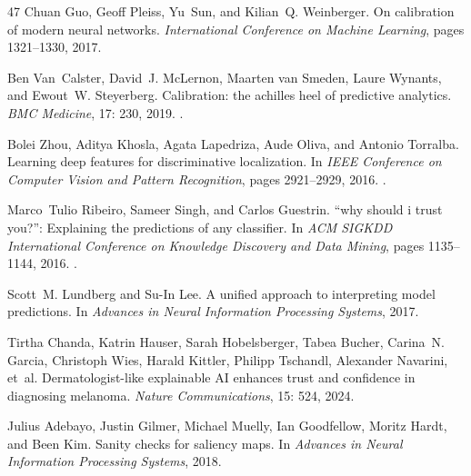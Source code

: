 \documentclass[11pt]{article}
\begin{document}
\begin{thebibliography}{47}
Chuan Guo, Geoff Pleiss, Yu~Sun, and Kilian~Q. Weinberger.
\newblock On calibration of modern neural networks.
\newblock \emph{International Conference on Machine Learning}, pages
  1321--1330, 2017.

Ben Van~Calster, David~J. McLernon, Maarten van Smeden, Laure Wynants, and
  Ewout~W. Steyerberg.
\newblock Calibration: the achilles heel of predictive analytics.
\newblock \emph{BMC Medicine}, 17: 230, 2019.
\newblock {}.

Bolei Zhou, Aditya Khosla, Agata Lapedriza, Aude Oliva, and Antonio Torralba.
\newblock Learning deep features for discriminative localization.
\newblock In \emph{IEEE Conference on Computer Vision and Pattern Recognition},
  pages 2921--2929, 2016.
\newblock {}.

Marco~Tulio Ribeiro, Sameer Singh, and Carlos Guestrin.
\newblock ``why should i trust you?'': Explaining the predictions of any
  classifier.
\newblock In \emph{ACM SIGKDD International Conference on Knowledge Discovery
  and Data Mining}, pages 1135--1144, 2016.
\newblock {}.

Scott~M. Lundberg and Su-In Lee.
\newblock A unified approach to interpreting model predictions.
\newblock In \emph{Advances in Neural Information Processing Systems}, 2017.

Tirtha Chanda, Katrin Hauser, Sarah Hobelsberger, Tabea Bucher, Carina~N.
  Garcia, Christoph Wies, Harald Kittler, Philipp Tschandl, Alexander Navarini,
  et~al.
\newblock Dermatologist-like explainable {AI} enhances trust and confidence in
  diagnosing melanoma.
\newblock \emph{Nature Communications}, 15: 524, 2024.

Julius Adebayo, Justin Gilmer, Michael Muelly, Ian Goodfellow, Moritz Hardt,
  and Been Kim.
\newblock Sanity checks for saliency maps.
\newblock In \emph{Advances in Neural Information Processing Systems}, 2018.


\end{thebibliography}
\end{document}
